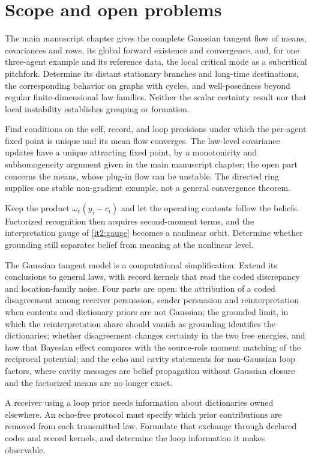 \documentclass[11pt,letterpaper]{report}
\begin{document}
\chapter{Scope and open problems}
\label{it2:ch-next}

The main manuscript chapter gives the complete Gaussian tangent flow of means, covariances and rows, its global forward existence and convergence, and, for one three-agent example and its reference data, the local critical mode as a subcritical pitchfork. Determine its distant stationary branches and long-time destinations, the corresponding behavior on graphs with cycles, and well-posedness beyond regular finite-dimensional law families. Neither the scalar certainty result nor that local instability establishes grouping or formation.

Find conditions on the self, record, and loop precisions under which the per-agent fixed point is unique and its mean flow converges. The law-level covariance updates have a unique attracting fixed point, by a monotonicity and subhomogeneity argument given in the main manuscript chapter; the open part concerns the means, whose plug-in flow can be unstable. The directed ring supplies one stable non-gradient example, not a general convergence theorem.

Keep the product $\omega_e(y_i-c_i)$ and let the operating contents follow the beliefs. Factorized recognition then acquires second-moment terms, and the interpretation gauge of \cref{it2:gauge} becomes a nonlinear orbit. Determine whether grounding still separates belief from meaning at the nonlinear level.

The Gaussian tangent model is a computational simplification. Extend its conclusions to general laws, with record kernels that read the coded discrepancy and location-family noise. Four parts are open: the attribution of a coded disagreement among receiver persuasion, sender persuasion and reinterpretation when contents and dictionary priors are not Gaussian; the grounded limit, in which the reinterpretation share should vanish as grounding identifies the dictionaries; whether disagreement changes certainty in the two free energies, and how that Bayesian effect compares with the source-role moment matching of the reciprocal potential; and the echo and cavity statements for non-Gaussian loop factors, where cavity messages are belief propagation without Gaussian closure and the factorized means are no longer exact.

A receiver using a loop prior needs information about dictionaries owned elsewhere. An echo-free protocol must specify which prior contributions are removed from each transmitted law. Formulate that exchange through declared codes and record kernels, and determine the loop information it makes observable.

\begingroup
\small
\setlength{\bibsep}{3pt}


\endgroup
\end{document}
